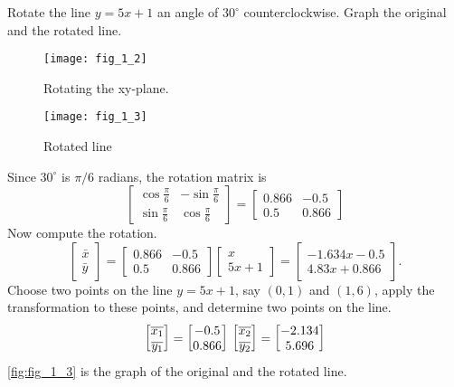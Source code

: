 \documentclass[../main.tex]{subfiles}
\begin{document}
\begin{example}
	Rotate the line $y=5 x+1$ an angle of $30^{\circ}$ counterclockwise. Graph the original and the rotated line.
\begin{figure}
	\centering
	\texttt{[image: fig\_1\_2]}
	\caption{Rotating the xy-plane.}
	\label{fig:fig_1_2}
\end{figure}

\begin{figure}
	\centering
	\texttt{[image: fig\_1\_3]}
	\caption{Rotated line}
	\label{fig:fig_1_3}
\end{figure}

Since $30^{\circ}$ is $\pi / 6$ radians, the rotation matrix is
$$
\left[\begin{array}{cc}
\cos \frac{\pi}{6} & -\sin \frac{\pi}{6} \\
\sin \frac{\pi}{6} & \cos \frac{\pi}{6}
\end{array}\right]=\left[\begin{array}{cc}
0.866 & -0.5 \\
0.5 & 0.866
\end{array}\right]
$$
Now compute the rotation.
$$
\left[\begin{array}{c}
\bar{x} \\
\bar{y}
\end{array}\right]=\left[\begin{array}{cc}
0.866 & -0.5 \\
0.5 & 0.866
\end{array}\right]\left[\begin{array}{c}
x \\
5 x+1
\end{array}\right]=\left[\begin{array}{c}
-1.634 x-0.5 \\
4.83 x+0.866
\end{array}\right].
$$
Choose two points on the line $y=5 x+1$, say $(0,1)$ and $(1,6)$, apply the transformation to these points, and determine two points on the line.
$$
\begin{bmatrix}
	\overline{x_{1}} \\
	\overline{y_{1}}\\
\end{bmatrix} =
\begin{bmatrix}
-0.5 \\
0.866
\end{bmatrix}\\
\begin{bmatrix}
	\overline{x_{2}} \\
	\overline{y_{2}}
\end{bmatrix} =
\begin{bmatrix}
-2.134 \\
5.696
\end{bmatrix}
$$
 \autoref{fig:fig_1_3} is the graph of the original and the rotated line.
\end{example}
\end{document}
